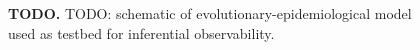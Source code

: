 \begin{figure}
\centering
{}
\caption{
\textbf{TODO.}
\footnotesize
TODO: schematic of evolutionary-epidemiological model used as testbed for inferential observability.
}
\label{fig:model-schematic}
\end{figure}
